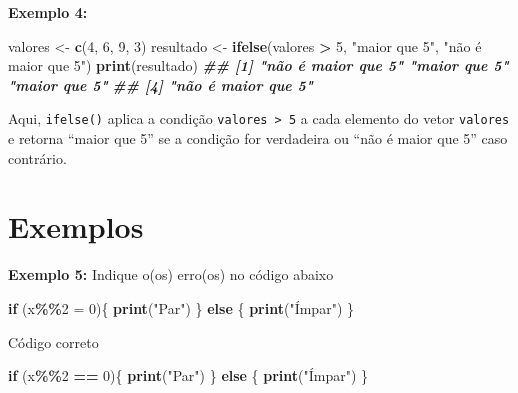 \documentclass[
]{book}
\newenvironment{Shaded}{\begin{snugshade}}{\end{snugshade}}
\newcommand{\ControlFlowTok}[1]{\textcolor[rgb]{0.13,0.29,0.53}{\textbf{#1}}}
\newcommand{\DecValTok}[1]{\textcolor[rgb]{0.00,0.00,0.81}{#1}}
\newcommand{\DocumentationTok}[1]{\textcolor[rgb]{0.56,0.35,0.01}{\textbf{\textit{#1}}}}
\newcommand{\FunctionTok}[1]{\textcolor[rgb]{0.13,0.29,0.53}{\textbf{#1}}}
\newcommand{\NormalTok}[1]{#1}
\newcommand{\OtherTok}[1]{\textcolor[rgb]{0.56,0.35,0.01}{#1}}
\newcommand{\SpecialCharTok}[1]{\textcolor[rgb]{0.81,0.36,0.00}{\textbf{#1}}}
\newcommand{\StringTok}[1]{\textcolor[rgb]{0.31,0.60,0.02}{#1}}
\begin{document}
\textbf{Exemplo 4:}

\begin{Shaded}
\begin{Highlighting}[]
\NormalTok{valores }\OtherTok{\textless{}{-}} \FunctionTok{c}\NormalTok{(}\DecValTok{4}\NormalTok{, }\DecValTok{6}\NormalTok{, }\DecValTok{9}\NormalTok{, }\DecValTok{3}\NormalTok{)}
\NormalTok{resultado }\OtherTok{\textless{}{-}} \FunctionTok{ifelse}\NormalTok{(valores }\SpecialCharTok{\textgreater{}} \DecValTok{5}\NormalTok{, }\StringTok{"maior que 5"}\NormalTok{, }\StringTok{"não é maior que 5"}\NormalTok{)}
\FunctionTok{print}\NormalTok{(resultado)}
\DocumentationTok{\#\# [1] "não é maior que 5" "maior que 5"       "maior que 5"      }
\DocumentationTok{\#\# [4] "não é maior que 5"}
\end{Highlighting}
\end{Shaded}

Aqui, \texttt{ifelse()} aplica a condição \texttt{valores\ \textgreater{}\ 5} a cada elemento do
vetor \texttt{valores} e retorna ``maior que 5'' se a condição for verdadeira ou
``não é maior que 5'' caso contrário.

\section{Exemplos}\label{exemplos}

\textbf{Exemplo 5:} Indique o(os) erro(os) no código abaixo

\begin{Shaded}
\begin{Highlighting}[]
\ControlFlowTok{if}\NormalTok{ (x}\SpecialCharTok{\%\%}\DecValTok{2} \OtherTok{=} \DecValTok{0}\NormalTok{)\{  }
      \FunctionTok{print}\NormalTok{(}\StringTok{"Par"}\NormalTok{)}
\NormalTok{\} }\ControlFlowTok{else}\NormalTok{ \{  }
    \FunctionTok{print}\NormalTok{(}\StringTok{"Ímpar"}\NormalTok{)}
\NormalTok{\}}
\end{Highlighting}
\end{Shaded}

Código correto

\begin{Shaded}
\begin{Highlighting}[]
\ControlFlowTok{if}\NormalTok{ (x}\SpecialCharTok{\%\%}\DecValTok{2} \SpecialCharTok{==} \DecValTok{0}\NormalTok{)\{  }
  \FunctionTok{print}\NormalTok{(}\StringTok{"Par"}\NormalTok{)}
\NormalTok{\} }\ControlFlowTok{else}\NormalTok{ \{  }
    \FunctionTok{print}\NormalTok{(}\StringTok{"Ímpar"}\NormalTok{)}
\NormalTok{\}}
\end{Highlighting}
\end{Shaded}
\end{document}
